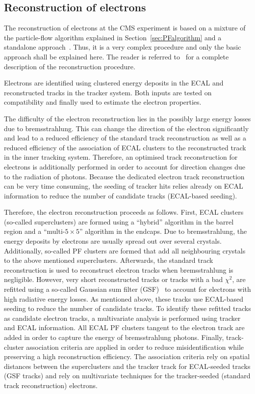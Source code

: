 \subsection{Reconstruction of electrons}
\label{subsec:ElectronReconstruction}
The reconstruction of electrons at the CMS experiment is based on a mixture of the particle-flow algorithm explained in Section~\ref{sec:PFalgorithm} and a standalone approach~\cite{bib:StandaloneElectronReconstruction}.
Thus, it is a very complex procedure and only the basic approach shall be explained here.
The reader is referred to~\cite{bib:CMS:elec_recoEff} for a complete description of the reconstruction procedure.

Electrons are identified using clustered energy deposits in the ECAL and reconstructed tracks in the tracker system. 
Both inputs are tested on compatibility and finally used to estimate the electron properties. 

The difficulty of the electron reconstruction lies in the possibly large energy losses due to bremsstrahlung.
This can change the direction of the electron significantly and lead to a reduced efficiency of the standard track reconstruction as well as a reduced efficiency of the association of ECAL clusters to the reconstructed track in the inner tracking system.
Therefore, an optimised track reconstruction for electrons is additionally performed in order to account for direction changes due to the radiation of photons.
Because the dedicated electron track reconstruction can be very time consuming, the seeding of tracker hits relies already on ECAL information to reduce the number of candidate tracks (ECAL-based seeding).

Therefore, the electron reconstruction proceeds as follows.
First, ECAL clusters (so-called superclusters) are formed using a ``hybrid'' algorithm in the barrel region and a ``multi-$5\times 5$'' algorithm in the endcaps.
Due to bremsstrahlung, the energy deposits by electrons are usually spread out over several crystals.
Additionally, so-called PF clusters are formed that add all neighbouring crystals to the above mentioned superclusters. 
Afterwards, the standard track reconstruction is used to reconstruct electron tracks when bremsstrahlung is negligible.
However, very short reconstructed tracks or tracks with a bad $\chi^2$, are refitted using a so-called Gaussian sum filter (GSF)~\cite{bib:GSF_2003} to account for electrons with high radiative energy losses.
As mentioned above, these tracks use ECAL-based seeding to reduce the number of candidate tracks.  
To identify these refitted tracks as candidate electron tracks, a multivariate analysis is performed using tracker and ECAL information.
All ECAL PF clusters tangent to the electron track are added in order to capture the energy of bremsstrahlung photons.
Finally, track-cluster association criteria are applied in order to reduce misidentification while preserving a high reconstruction efficiency.
The association criteria rely on spatial distances between the superclusters and the tracker track for ECAL-seeded tracks (GSF tracks) and rely on multivariate techniques for the tracker-seeded (standard track reconstruction) electrons.

